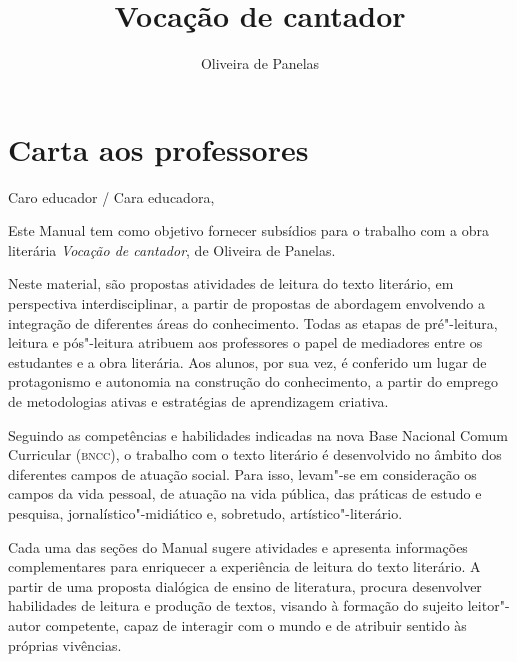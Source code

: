 \documentclass{article}
\begin{document}
\newcommand{\AutorLivro}{Oliveira de Panelas}
\newcommand{\TituloLivro}{Vocação de cantador}
\newcommand{\Tema}{Ficção, mistério e fantasia}
\newcommand{\Genero}{Poema}
\newcommand{\issnppub}{---}
\newcommand{\issnepub}{---}
\newcommand{\colaborador}{\textbf{Mariana Barrile, Bruno Gradella e Vicente Castro} é uma pessoa incrível e vai fazer um bom serviço.}


\title{\TituloLivro}
\author{\AutorLivro}
\def\authornotes{\colaborador}

\date{}
\maketitle
\tableofcontents

\pagebreak

\section{Carta aos professores}

Caro educador / Cara educadora,\\\bigskip

Este Manual tem como objetivo fornecer subsídios para o trabalho com a
obra literária \emph{Vocação de cantador}, de Oliveira de Panelas.

Neste material, são propostas atividades de leitura do texto literário,
em perspectiva interdisciplinar, a partir de propostas de abordagem
envolvendo a integração de diferentes áreas do conhecimento. Todas as
etapas de pré"-leitura, leitura e pós"-leitura atribuem aos professores o
papel de mediadores entre os estudantes e a obra literária. Aos alunos,
por sua vez, é conferido um lugar de protagonismo e autonomia na
construção do conhecimento, a partir do emprego de metodologias ativas e
estratégias de aprendizagem criativa.

Seguindo as competências e habilidades indicadas na nova Base Nacional
Comum Curricular (\textsc{bncc}), o trabalho com o texto literário é desenvolvido
no âmbito dos diferentes campos de atuação social. Para isso, levam"-se
em consideração os campos da vida pessoal, de atuação na vida pública,
das práticas de estudo e pesquisa, jornalístico"-midiático e, sobretudo,
artístico"-literário.

Cada uma das seções do Manual sugere atividades e apresenta informações
complementares para enriquecer a experiência de leitura do texto
literário. A partir de uma proposta dialógica de ensino de literatura,
procura desenvolver habilidades de leitura e produção de textos, visando
à formação do sujeito leitor"-autor competente, capaz de interagir com o
mundo e de atribuir sentido às próprias vivências.
\end{document}
